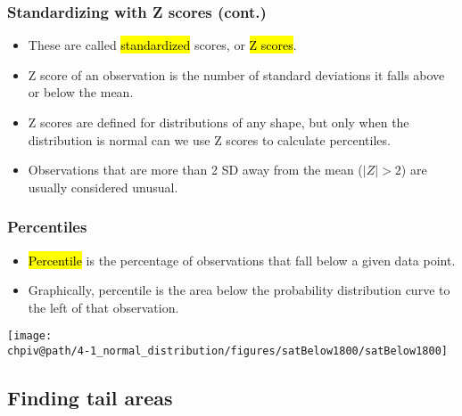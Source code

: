 \documentclass[slidestop,compress,mathserif]{beamer}
\makeatletter
\def\chpiv@path{../../Chp 4}
\makeatother
\begin{document}

\begin{frame}
\frametitle{Standardizing with Z scores (cont.)}

\begin{itemize}

\item These are called \hl{standardized} scores, or \hl{Z scores}.

\item Z score of an observation is the number of standard deviations it falls above or below the mean.
\formula{\[Z = \frac{observation - mean}{SD}\]}

\item Z scores are defined for distributions of any shape, but only when the distribution is normal can we use Z scores to calculate percentiles.

\item Observations that are more than 2 SD away from the mean ($|Z| > 2$) are usually considered unusual.

\end{itemize}

\end{frame}


\begin{frame}
\frametitle{Percentiles}

\begin{itemize}

\item \hl{Percentile} is the percentage of observations that fall below a given data point. 

\item Graphically, percentile is the area below the probability distribution curve to the left of that observation.

\end{itemize}

\begin{center}
\texttt{[image: \\chpiv@path/4-1\_normal\_distribution/figures/satBelow1800/satBelow1800]}
\end{center}

\end{frame}

\subsection{Finding tail areas}
\end{document}
